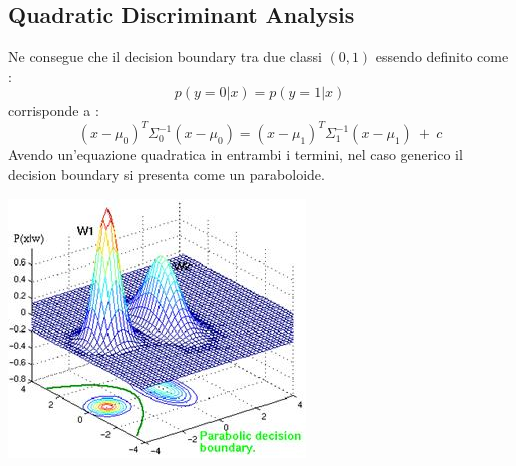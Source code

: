 \documentclass[a4paper,8pt]{article}
\newenvironment{Figure}
  {\par\medskip\noindent\minipage{\linewidth}}
  {\endminipage\par\medskip}
\begin{document}
\begin{multicols}{2}
\subsection{Quadratic Discriminant Analysis}
Ne consegue che il decision boundary tra due classi $(0,1)$ essendo definito come :
\begin{equation}
p(y = 0 | x) = p(y=1|x)
\end{equation}
corrisponde a :
\begin{equation}
( x-  \mu_0)^T \Sigma_0^{-1} (  x-  \mu_0) = ( x-  \mu_1)^T \Sigma_1^{-1} (  x-  \mu_1)\ + \ c
\end{equation}
Avendo un'equazione quadratica in entrambi i termini, nel caso generico il decision boundary si presenta come un paraboloide.
\begin{Figure}
 \centering
 \includegraphics[width=\linewidth]{GDA}
\end{Figure}

\end{multicols}
\end{document}
